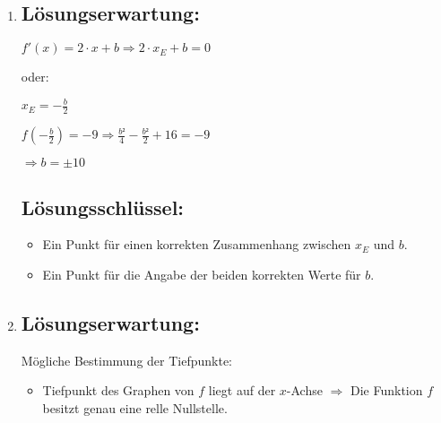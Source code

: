 \begin{langesbeispiel}
{\begin{enumerate}
	$7=(-1)²+b\cdot (-1)+16 \Rightarrow -10=-b$
	
	$b=10$\leer
	
	$f'(-1)=2\cdot (-1)+10=8$
	
	\subsection{Lösungsschlüssel:}
	\begin{itemize}
		\item Ein Ausgleichspunkt für die korrekte Angabe des Parameters $b$.
		\item Ein Punkt für die korrekte Angabe der Steigung der Funktion $f$ an der Stelle $x = -1$.
	\end{itemize}
	
	\item \subsection{Lösungserwartung:}
			
		$f'(x)=2\cdot x+b \Rightarrow 2\cdot x_E+b=0$
		
		oder:
		
		$x_E=-\frac{b}{2}$
		
		$f\left(-\frac{b}{2}\right)=-9 \Rightarrow\frac{b²}{4}-\frac{b²}{2}+16=-9$
		
		$\Rightarrow b=\pm 10$

	\subsection{Lösungsschlüssel:}
	
\begin{itemize}
	\item Ein Punkt für einen korrekten Zusammenhang zwischen $x_E$ und $b$.
	\item Ein Punkt für die Angabe der beiden korrekten Werte für $b$.
\end{itemize}

\item \subsection{Lösungserwartung:}

	Mögliche Bestimmung der Tiefpunkte:
	
	\begin{itemize}
		\item Tiefpunkt des Graphen von $f$ liegt auf der $x$-Achse $\Rightarrow$ Die Funktion $f$ besitzt genau eine relle Nullstelle.
		

\end{itemize}
\end{enumerate}}
\end{langesbeispiel}

